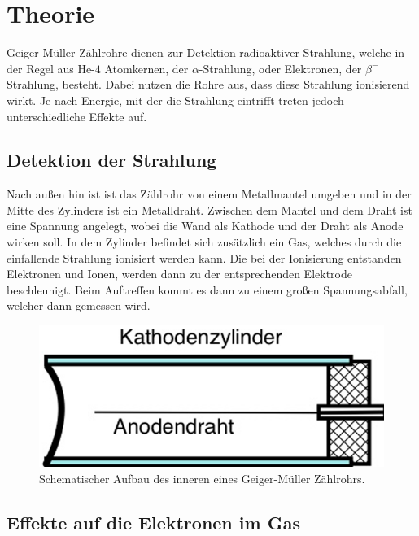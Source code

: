 \section{Theorie}
\label{sec:Theorie}

\noindent Geiger-Müller Zählrohre dienen zur Detektion radioaktiver Strahlung, welche in der Regel aus $\text{He-}4$ Atomkernen,
der $\alpha$-Strahlung, oder Elektronen, der $\beta^-$ Strahlung, besteht. Dabei nutzen die Rohre aus, dass diese 
Strahlung ionisierend wirkt. Je nach Energie, mit der die Strahlung eintrifft treten jedoch unterschiedliche Effekte auf.

\subsection{Detektion der Strahlung}

\noindent Nach außen hin ist ist das Zählrohr von einem Metallmantel umgeben und in der Mitte des Zylinders ist ein Metalldraht.
Zwischen dem Mantel und dem Draht ist eine Spannung angelegt, wobei die Wand als Kathode und der Draht als Anode
wirken soll. In dem Zylinder befindet sich zusätzlich ein Gas, welches durch die einfallende Strahlung ionisiert
werden kann. Die bei der Ionisierung entstanden Elektronen und Ionen, werden dann zu der entsprechenden Elektrode
beschleunigt. Beim Auftreffen kommt es dann zu einem großen Spannungsabfall, welcher dann gemessen wird.

\begin{figure}
    \includegraphics[width=\textwidth]{Bilder/zaelrohr.png}
    \caption{Schematischer Aufbau des inneren eines Geiger-Müller Zählrohrs.}
    \label{fig:geiger}
\end{figure}

\subsection{Effekte auf die Elektronen im Gas}

